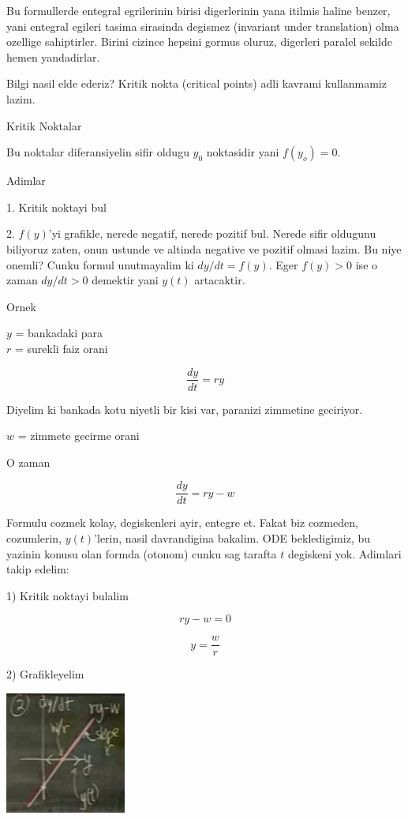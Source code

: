\documentclass[12pt,fleqn]{article}\usepackage{../common}
\begin{document}
Bu formullerde entegral egrilerinin birisi digerlerinin yana itilmis haline
benzer, yani entegral egileri tasima sirasinda degismez (invariant under
translation) olma ozellige sahiptirler. Birini cizince hepsini gormus
oluruz, digerleri paralel sekilde hemen yandadirlar.

Bilgi nasil elde ederiz? Kritik nokta (critical points) adli kavrami
kullanmamiz lazim.

Kritik Noktalar

Bu noktalar diferansiyelin sifir oldugu $y_0$ noktasidir yani $f(y_o) = 0$.

Adimlar

1. Kritik noktayi bul

2. $f(y)$'yi grafikle, nerede negatif, nerede pozitif bul. Nerede sifir
oldugunu biliyoruz zaten, onun ustunde ve altinda negative ve pozitif
olmasi lazim. Bu niye onemli? Cunku formul unutmayalim ki $dy/dt =
f(y)$. 
Eger $f(y) > 0$ ise o zaman $dy/dt > 0$ demektir yani $y(t)$ artacaktir.

Ornek

$y$ = bankadaki para \\
$r$ = surekli faiz orani

\[ \frac{dy}{dt} = ry \]

Diyelim ki bankada kotu niyetli bir kisi var, paranizi zimmetine
geciriyor. 

$w$ = zimmete gecirme orani

O zaman

\[ \frac{dy}{dt} = ry - w\]

Formulu cozmek kolay, degiskenleri ayir, entegre et. Fakat biz cozmeden,
cozumlerin, $y(t)$'lerin, nasil davrandigina bakalim. ODE bekledigimiz, bu
yazinin konusu olan formda (otonom) cunku sag tarafta $t$ degiskeni
yok. Adimlari takip edelim:

1) Kritik noktayi bulalim

\[ ry - w = 0 \]

\[ y = \frac{w}{r} \]

2) Grafikleyelim

\includegraphics[height=4cm]{5_4.png}
\end{document}
